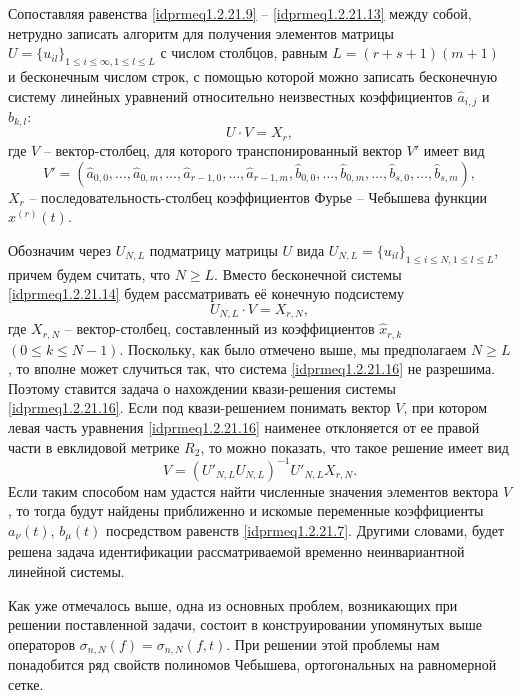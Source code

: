 Сопоставляя равенства \eqref{idprmeq1.2.21.9} -- \eqref{idprmeq1.2.21.13} между собой, нетрудно записать алгоритм для получения элементов матрицы $U=\{u_{il}\}_{1\le i\le \infty,1\le l\le L}$ с числом столбцов, равным $L=(r+s+1)(m+1)$  и бесконечным числом строк, с помощью которой можно записать бесконечную систему линейных уравнений относительно неизвестных коэффициентов $\hat{a}_{i,j}$ и $\hat{b}_{k,l}$:
\begin{equation}\label{idprmeq1.2.21.14}
U\cdot V=X_r,
\end{equation}
где $V$ -- вектор-столбец, для которого транспонированный вектор $V'$ имеет вид
\begin{equation}\label{idprmeq1.2.21.15}
V'= (\hat a_{0,0},\ldots,\hat a_{0,m},\ldots, \hat a_{r-1,0},\ldots,\hat a_{r-1,m},\hat b_{0,0},\ldots,\hat b_{0,m},\ldots, \hat b_{s,0},\ldots,\hat b_{s,m} ),
\end{equation}
$X_r$ -- последовательность-столбец коэффициентов Фурье -- Чебышева функции $x^{(r)}(t)$.

Обозначим через $U_{N,L}$ подматрицу матрицы $U$ вида $U_{N,L}=\{u_{il}\}_{1\le i\le N,1\le l\le L}$, причем будем считать, что $N\ge L$.
Вместо бесконечной системы  \eqref{idprmeq1.2.21.14} будем рассматривать её конечную подсистему
\begin{equation}\label{idprmeq1.2.21.16}
U_{N,L}\cdot V=X_{r,N},
\end{equation}
 где $X_{r,N}$ -- вектор-столбец, составленный из коэффициентов $\hat x_{r,k}$ $(0\le k\le N-1)$. Поскольку, как было отмечено выше, мы предполагаем $N\ge L$, то вполне может случиться так, что система \eqref{idprmeq1.2.21.16} не разрешима. Поэтому ставится задача о нахождении квази-решения
 системы \eqref{idprmeq1.2.21.16}. Если под квази-решением понимать вектор $V$, при котором левая часть уравнения \eqref{idprmeq1.2.21.16} наименее отклоняется от ее правой части в евклидовой метрике $R_2$, то можно показать, что такое решение имеет вид
 \begin{equation}\label{idprmeq1.2.21.17}
 V=(U'_{N,L}U_{N,L})^{-1}U'_{N,L}X_{r,N}.
 \end{equation}
 Если таким способом нам удастся найти численные значения элементов вектора $V$, то тогда будут найдены приближенно и искомые переменные коэффициенты  $a_\nu(t)$, $b_\mu(t)$ посредством равенств \eqref{idprmeq1.2.21.7}. Другими словами, будет решена задача идентификации рассматриваемой временно неинвариантной линейной системы.

Как уже отмечалось выше, одна из основных проблем, возникающих при решении поставленной задачи, состоит в конструировании упомянутых выше операторов $\sigma_{n,N}(f)=\sigma_{n,N}(f,t)$. При решении этой проблемы нам понадобится ряд свойств полиномов Чебышева, ортогональных на равномерной сетке.

